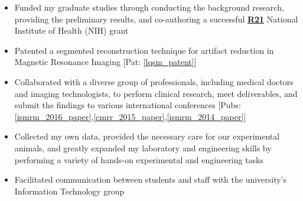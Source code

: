 \begin{minipage}{\textwidth}
	\begin{itemize}
	\item Funded my graduate studies through conducting the background research, providing the preliminary results, and co-authoring a successful \href{https://grants.nih.gov/grants/funding/r21.htm}{\textbf{R21}} National Institute of Health (NIH) grant\none
   	\item Patented a segmented reconstruction technique for artifact reduction in Magnetic Resonance Imaging [Pat: \ref{lqsm_patent}]\none
	\item Collaborated with a diverse group of professionals, including medical doctors and imaging technologists, to perform clinical research, meet deliverables, and submit the findings to various international conferences [Pubs: \ref{ismrm_2016_paper},\ref{cmrr_2015_paper},\ref{ismrm_2014_paper}]\none
	\item Collected my own data, provided the necessary care for our experimental animals, and greatly expanded my laboratory and engineering skills by performing a variety of hands-on experimental and engineering tasks\none
	\item Facilitated communication between students and staff with the university's Information Technology group\ntwo

\end{itemize}
\end{minipage}
